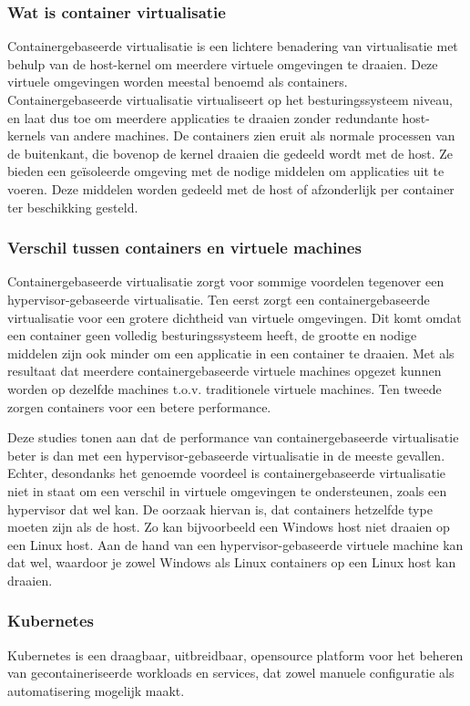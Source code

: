 \subsubsection{Wat is container virtualisatie}

Containergebaseerde virtualisatie is een lichtere benadering van virtualisatie met behulp van de host-kernel om meerdere virtuele omgevingen te draaien. Deze virtuele omgevingen worden meestal benoemd als containers. Containergebaseerde virtualisatie virtualiseert op het besturingssysteem niveau, en laat dus toe om meerdere applicaties te draaien zonder redundante host-kernels van andere machines. De containers zien eruit als normale processen van de buitenkant, die bovenop de kernel draaien die gedeeld wordt met de host. Ze bieden een geïsoleerde omgeving met de nodige middelen om applicaties uit te voeren. Deze middelen worden gedeeld met de host of afzonderlijk per container ter beschikking gesteld. \autocite{Thanh2015}

\subsubsection{Verschil tussen containers en virtuele machines}
Containergebaseerde virtualisatie zorgt voor sommige voordelen tegenover een hypervisor-gebaseerde virtualisatie. Ten eerst zorgt een containergebaseerde virtualisatie voor een grotere dichtheid van virtuele omgevingen. Dit komt omdat een container geen volledig besturingssysteem heeft, de grootte en nodige middelen zijn ook minder om een applicatie in een container te draaien. Met als resultaat dat meerdere containergebaseerde virtuele machines opgezet kunnen worden op dezelfde machines t.o.v. traditionele virtuele machines. Ten tweede zorgen containers voor een betere performance. \autocite{Ruiz2015}

Deze studies tonen aan dat de performance van containergebaseerde virtualisatie beter is dan met een hypervisor-gebaseerde virtualisatie in de meeste gevallen. Echter, desondanks het genoemde voordeel is containergebaseerde virtualisatie niet in staat om een verschil in virtuele omgevingen te ondersteunen, zoals een hypervisor dat wel kan. De oorzaak hiervan is, dat containers hetzelfde type moeten zijn als de host. Zo kan bijvoorbeeld een Windows host niet draaien op een Linux host. Aan de hand van een hypervisor-gebaseerde virtuele machine kan dat wel, waardoor je zowel Windows als Linux containers op een Linux host kan draaien. \autocite{Ruiz2015}

\subsubsection{Kubernetes}
Kubernetes is een draagbaar, uitbreidbaar, opensource platform voor het beheren van gecontaineriseerde workloads en services, dat zowel manuele configuratie als automatisering mogelijk maakt. \autocite{Kubernetes2021}

